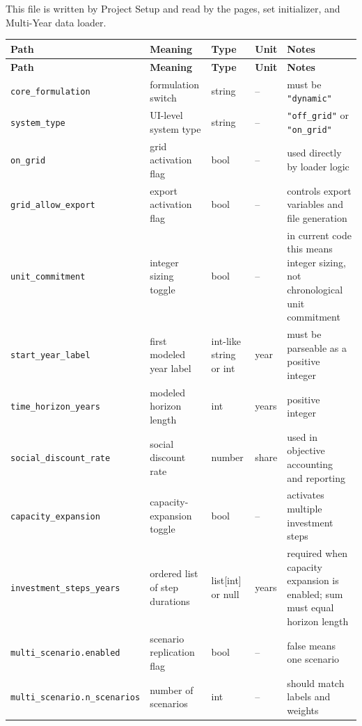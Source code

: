 \documentclass[11pt,a4paper]{report}
\newcommand{\code}[1]{\texttt{#1}}
\begin{document}
\section{}

This file is written by Project Setup and read by the pages, set initializer, and Multi-Year data loader.

\begin{longtable}{p{}p{}p{}p{}p{}}
\toprule
\textbf{Path} & \textbf{Meaning} & \textbf{Type} & \textbf{Unit} & \textbf{Notes} \\
\midrule
\endfirsthead
\toprule
\textbf{Path} & \textbf{Meaning} & \textbf{Type} & \textbf{Unit} & \textbf{Notes} \\
\midrule
\endhead
\code{core\_formulation} & formulation switch & string & -- & must be \code{"dynamic"} \\
\code{system\_type} & UI-level system type & string & -- & \code{"off\_grid"} or \code{"on\_grid"} \\
\code{on\_grid} & grid activation flag & bool & -- & used directly by loader logic \\
\code{grid\_allow\_export} & export activation flag & bool & -- & controls export variables and file generation \\
\code{unit\_commitment} & integer sizing toggle & bool & -- & in current code this means integer sizing, not chronological unit commitment \\
\code{start\_year\_label} & first modeled year label & int-like string or int & year & must be parseable as a positive integer \\
\code{time\_horizon\_years} & modeled horizon length & int & years & positive integer \\
\code{social\_discount\_rate} & social discount rate & number & share & used in objective accounting and reporting \\
\code{capacity\_expansion} & capacity-expansion toggle & bool & -- & activates multiple investment steps \\
\code{investment\_steps\_years} & ordered list of step durations & list[int] or null & years & required when capacity expansion is enabled; sum must equal horizon length \\
\code{multi\_scenario.enabled} & scenario replication flag & bool & -- & false means one scenario \\
\code{multi\_scenario.n\_scenarios} & number of scenarios & int & -- & should match labels and weights \\

\end{longtable}
\end{document}
